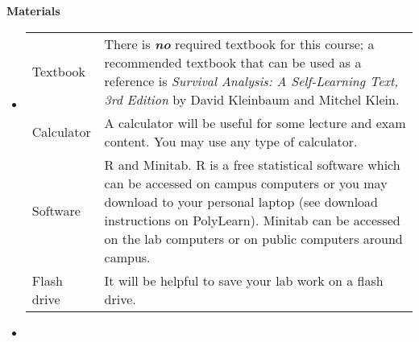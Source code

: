 \documentclass[letterpaper,12pt]{report}
\begin{document}
\textbf{Materials}
\begin{itemize}
\item[]
\begin{tabular}{p{2cm} p{14cm}}
Textbook & There is \textbf{\textit{no}} required textbook for this course; a recommended textbook that can be used as a reference is \textit{Survival Analysis: A Self-Learning Text, 3rd Edition} by David Kleinbaum and Mitchel Klein. \\
[1ex]
Calculator & A calculator will be useful for some lecture and exam content. You may use any type of calculator.\\
[1ex]
Software &  R and Minitab.  R is a free statistical software which can be accessed on campus computers or you may download to your personal laptop (see download instructions on PolyLearn). Minitab can be accessed on the lab computers or on public computers around campus. \\
[1ex]
Flash drive & It will be helpful to save your lab work on a flash drive. \\
[1ex]
\end{tabular}
\item[]
\end{itemize}
\end{document}
